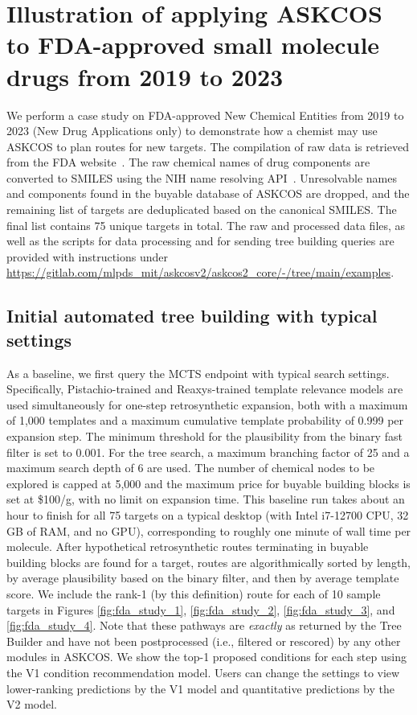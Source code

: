 \documentclass[pdflatex,sn-mathphys-num]{sn-jnl}%
\theoremstyle{thmstyleone}%
\theoremstyle{thmstyletwo}%
\theoremstyle{thmstylethree}%
\begin{document}
\section{Illustration of applying ASKCOS to FDA-approved small molecule drugs from 2019 to 2023}\label{results_fda}

We perform a case study on FDA-approved New Chemical Entities from 2019 to 2023 (New Drug Applications only) to demonstrate how a chemist may use ASKCOS to plan routes for new targets. The compilation of raw data is retrieved from the FDA website~\citep{FDAApproval}. The raw chemical names of drug components are converted to SMILES using the NIH name resolving API~\citep{NIHNameResolver}. Unresolvable names and components found in the buyable database of ASKCOS are dropped, and the remaining list of targets are deduplicated based on the canonical SMILES. The final list contains 75 unique targets in total. The raw and processed data files, as well as the scripts for data processing and for sending tree building queries are provided with instructions under \href{https://gitlab.com/mlpds\_mit/askcosv2/askcos2\_core/-/tree/main/examples}{https://gitlab.com/mlpds\_mit/askcosv2/askcos2\_core/-/tree/main/examples}.

\subsection{Initial automated tree building with typical settings}

As a baseline, we first query the MCTS endpoint with typical search settings. Specifically, Pistachio-trained and Reaxys-trained template relevance models are used simultaneously for one-step retrosynthetic expansion, both with a maximum of 1,000 templates and a maximum cumulative template probability of 0.999 per expansion step. The minimum threshold for the plausibility from the binary fast filter is set to 0.001. For the tree search, a maximum branching factor of 25 and a maximum search depth of 6 are used. The number of chemical nodes to be explored is capped at 5,000 and the maximum price for buyable building blocks is set at \$100/g, with no limit on expansion time. This baseline run takes about an hour to finish for all 75 targets on a typical desktop (with Intel i7-12700 CPU, 32 GB of RAM, and no GPU), corresponding to roughly one minute of wall time per molecule. After hypothetical retrosynthetic routes terminating in buyable building blocks are found for a target, routes are algorithmically sorted by length, by average plausibility based on the binary filter, and then by average template score. We include the rank-1 (by this definition) route for each of 10 sample targets in Figures \ref{fig:fda_study_1}, \ref{fig:fda_study_2}, \ref{fig:fda_study_3}, and \ref{fig:fda_study_4}. Note that these pathways are \emph{exactly} as returned by the Tree Builder and have not been postprocessed (i.e., filtered or rescored) by any other modules in ASKCOS. We show the top-1 proposed conditions for each step using the V1 condition recommendation model. Users can change the settings to view lower-ranking predictions by the V1 model and quantitative predictions by the V2 model.
\end{document}
